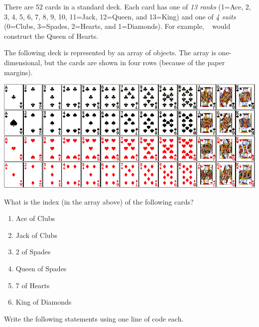 
There are 52 cards in a standard deck.
Each card has one of \emph{13 ranks} (1=Ace, 2, 3, 4, 5, 6, 7, 8, 9, 10, 11=Jack, 12=Queen, and 13=King) and one of \emph{4 suits} (0=Clubs, 3=Spades, 2=Hearts, and 1=Diamonds).
For example, ~ would construct the Queen of Hearts.

\vspace{1em}

The following deck is represented by an array of  objects.
The array is one-dimensional, but the cards are shown in four rows (because of the paper margins).

\begin{center}
\includegraphics[width=\linewidth]{playing-cards1.png}
\end{center}




\Q What is the index (in the array above) of the following cards?

\setlength{\defaultwidth}{3em}

\begin{multicols}{2}
\begin{enumerate}
\item Ace of Clubs     
\item Jack of Clubs    
\item 2 of Spades      
\item Queen of Spades  
\item 7 of Hearts      
\item King of Diamonds 
\end{enumerate}
\end{multicols}


\Q Write the following statements using one line of code each.

